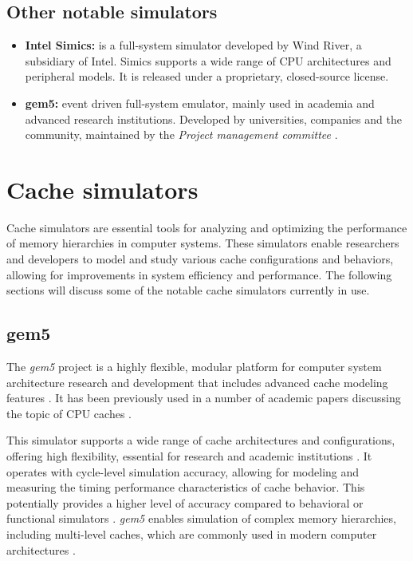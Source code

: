 \subsection{Other notable simulators}

\begin{itemize}
	\item \textbf{Intel Simics:} is a full-system simulator developed by Wind River, a subsidiary of Intel. Simics supports a wide range of CPU architectures and peripheral models.
		It is released under a proprietary, closed-source license.
	\item \textbf{gem5:} event driven full-system emulator, mainly used in academia and advanced research institutions. Developed by universities, companies and the community, maintained by the
		\textit{Project management committee} \cite{gem5governance}.
\end{itemize}

\section{Cache simulators}
Cache simulators are essential tools for analyzing and optimizing the performance of memory hierarchies in computer systems. These simulators enable researchers and developers to
model and study various cache configurations and behaviors, allowing for improvements in system efficiency and performance. The following sections will discuss some of the notable
cache simulators currently in use.

\subsection{gem5}

The \textit{gem5} project is a highly flexible, modular platform for computer system architecture research and development that includes advanced cache modeling features \cite{gem5cachesupport}.
It has been previously used in a number of academic papers discussing the topic of CPU caches \cite{gem5cachecite1, gem5cachecite2, gem5cachecite3}.

This simulator supports a wide range of cache architectures and configurations, offering high flexibility, essential for research and academic institutions \cite{gem5}.
It operates with cycle-level simulation accuracy, allowing for modeling and measuring the timing performance characteristics of cache behavior. This potentially provides a higher level of accuracy
compared to behavioral or functional simulators \cite{gem5accuracy}. \textit{gem5} enables simulation of complex memory hierarchies, including multi-level caches, which are commonly
used in modern computer architectures \cite{gem5multilevel, cachesimsurv}.

